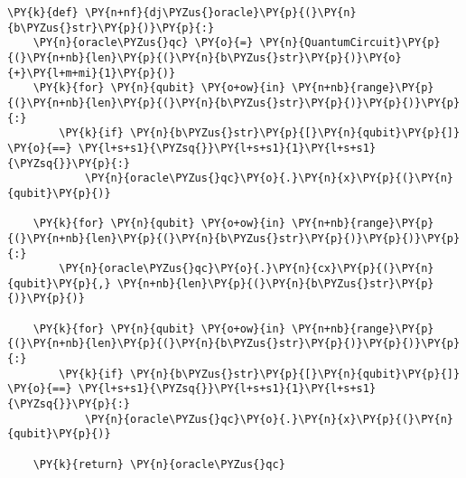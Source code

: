 

    

    

    
    \begin{tcolorbox}[breakable, size=fbox, boxrule=1pt, pad at break*=1mm,colback=cellbackground, colframe=cellborder]
\begin{Verbatim}[commandchars=\\\{\}]
\PY{k}{def} \PY{n+nf}{dj\PYZus{}oracle}\PY{p}{(}\PY{n}{b\PYZus{}str}\PY{p}{)}\PY{p}{:}
    \PY{n}{oracle\PYZus{}qc} \PY{o}{=} \PY{n}{QuantumCircuit}\PY{p}{(}\PY{n+nb}{len}\PY{p}{(}\PY{n}{b\PYZus{}str}\PY{p}{)}\PY{o}{+}\PY{l+m+mi}{1}\PY{p}{)}
    \PY{k}{for} \PY{n}{qubit} \PY{o+ow}{in} \PY{n+nb}{range}\PY{p}{(}\PY{n+nb}{len}\PY{p}{(}\PY{n}{b\PYZus{}str}\PY{p}{)}\PY{p}{)}\PY{p}{:}
        \PY{k}{if} \PY{n}{b\PYZus{}str}\PY{p}{[}\PY{n}{qubit}\PY{p}{]} \PY{o}{==} \PY{l+s+s1}{\PYZsq{}}\PY{l+s+s1}{1}\PY{l+s+s1}{\PYZsq{}}\PY{p}{:}
            \PY{n}{oracle\PYZus{}qc}\PY{o}{.}\PY{n}{x}\PY{p}{(}\PY{n}{qubit}\PY{p}{)}
            
    \PY{k}{for} \PY{n}{qubit} \PY{o+ow}{in} \PY{n+nb}{range}\PY{p}{(}\PY{n+nb}{len}\PY{p}{(}\PY{n}{b\PYZus{}str}\PY{p}{)}\PY{p}{)}\PY{p}{:}
        \PY{n}{oracle\PYZus{}qc}\PY{o}{.}\PY{n}{cx}\PY{p}{(}\PY{n}{qubit}\PY{p}{,} \PY{n+nb}{len}\PY{p}{(}\PY{n}{b\PYZus{}str}\PY{p}{)}\PY{p}{)}
        
    \PY{k}{for} \PY{n}{qubit} \PY{o+ow}{in} \PY{n+nb}{range}\PY{p}{(}\PY{n+nb}{len}\PY{p}{(}\PY{n}{b\PYZus{}str}\PY{p}{)}\PY{p}{)}\PY{p}{:}
        \PY{k}{if} \PY{n}{b\PYZus{}str}\PY{p}{[}\PY{n}{qubit}\PY{p}{]} \PY{o}{==} \PY{l+s+s1}{\PYZsq{}}\PY{l+s+s1}{1}\PY{l+s+s1}{\PYZsq{}}\PY{p}{:}
            \PY{n}{oracle\PYZus{}qc}\PY{o}{.}\PY{n}{x}\PY{p}{(}\PY{n}{qubit}\PY{p}{)}
    
    \PY{k}{return} \PY{n}{oracle\PYZus{}qc}
\end{Verbatim}
\end{tcolorbox}

